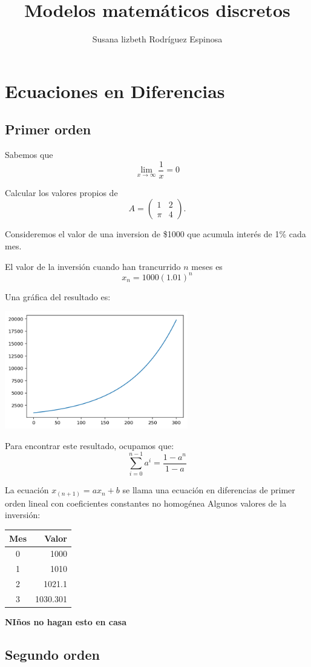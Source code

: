 \documentclass{article}
\title{Modelos matemáticos discretos}
\author{Susana lizbeth Rodríguez Espinosa}
\begin{document}
\maketitle
\section{Ecuaciones en Diferencias}
\subsection{Primer orden}
Sabemos que $$\lim_{x\to\infty}\frac{1}{x}=0$$

Calcular los valores propios de $$A=
\begin{pmatrix}
1 & 2\\
\pi & 4
\end{pmatrix}.
$$

Consideremos el valor de una inversion de \$1000 que acumula interés de 1\% cada mes.

El valor de la inversión cuando han trancurrido $n$ meses es $$x_n=1000(1.01)^n$$

Una gráfica del resultado es:

\begin{center}
\includegraphics[width=8cm]{grafica}
\end{center}

Para encontrar este resultado, ocupamos que:
$$\sum_{i=0}^{n-1}a^i=\frac{1-a^{n}}{1-a}$$

La ecuación $x_(n+1)=ax_n+b$ se llama una ecuación en diferencias de primer orden lineal con coeficientes constantes no homogénea
Algunos valores de la inversión:
\begin{center}
\begin{tabular}{|c|r|}
\hline
\hline
Mes & Valor\\
\hline
0 & 1000\\
1 & 1010\\
2 & 1021.1\\
3 & 1030.301\\
\hline
\end{tabular}
\end{center}


\begin{center}
\huge
\textbf{NIños no hagan esto en casa}
\end{center}

\subsection{Segundo orden}
\end{document}
